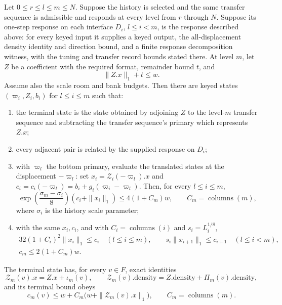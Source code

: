 \begin{lemma}
\label{lem:actual-marked-antilles}
Let $0\leq r\leq l\leq m\leq N$. Suppose the history is selected and the
same transfer sequence is admissible and responds at every level from $r$ through $N$.
Suppose its one-step response on each interface $D_i$, $l\leq i<m$, is the
response described above: for every keyed input it supplies a keyed output,
the all-displacement density identity and direction bound, and a finite response decomposition
witness, with the tuning and transfer record bounds stated there. At level $m$, let $Z$ be a
coefficient with the required format, remainder bound $t$, and
\[
             \|Z.x\|_1+t\leq w.
\]
Assume also the scale room and bank budgets. Then there are keyed states
$(\varpi_i,Z_i,b_i)$ for $l\leq i\leq m$ such that:
\begin{enumerate}
\item the terminal state is the state obtained by adjoining $Z$ to the
  level-$m$ transfer sequence and subtracting the transfer sequence's primary which represents
  $Z.x$;
\item every adjacent pair is related by the supplied response on $D_i$;
\item with $\varpi_l$ the bottom primary, evaluate the translated states at
  the displacement $-\varpi_l$: set $x_i=\mathcal Z_i(-\varpi_l).x$ and
  $c_i=c_i(-\varpi_l)=b_i+g_i(\varpi_i-\varpi_l)$. Then, for every
  $l\leq i\leq m$,
  \[
    \exp\!\left(\frac{\sigma_m-\sigma_i}{8}\right)
       (c_i+\|x_i\|_1)\leq 4(1+C_m)w,
    \qquad C_m=\operatorname{columns}(m),
  \]
  where $\sigma_i$ is the history scale parameter;
\item with the same $x_i,c_i$, and with $C_i=\operatorname{columns}(i)$
  and $s_i=L_i^{1/8}$,
  \begin{gather*}
    32(1+C_i)^2\|x_i\|_1\leq c_i\quad(l\leq i\leq m),\qquad
    s_i\|x_{i+1}\|_1\leq c_{i+1}\quad(l\leq i<m),\\
    c_m\leq2(1+C_m)w.
  \end{gather*}
\end{enumerate}
The terminal state has, for every $v\in F$, exact identities
\[
 \mathcal Z_m(v).x=Z.x+\iota_m(v),\qquad
 \mathcal Z_m(v).\mathrm{density}
       =Z.\mathrm{density}+\Pi_m(v).\mathrm{density},
\]
and its terminal bound obeys
\[
 c_m(v)\leq w+C_m\bigl(w+\|\mathcal Z_m(v).x\|_1\bigr),
       \qquad C_m=\operatorname{columns}(m).
\]
\end{lemma}
